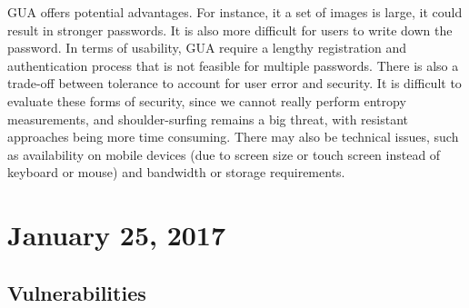 \documentclass[11pt]{article}
\theoremstyle{plain} %
\theoremstyle{definition}
\theoremstyle{example}
\theoremstyle{remark}
\begin{document}
GUA offers potential advantages. For instance, it a set of images is large, it could result in stronger passwords. It is also more difficult for users to write down the password. In terms of usability, GUA require a lengthy registration and authentication process that is not feasible for multiple passwords. There is also a trade-off between tolerance to account for user error and security. It is difficult to evaluate these forms of security, since we cannot really perform entropy measurements, and shoulder-surfing remains a big threat, with resistant approaches being more time consuming. There may also be technical issues, such as availability on mobile devices (due to screen size or touch screen instead of keyboard or mouse) and bandwidth or storage requirements. 


\section{January 25, 2017}
\subsection{Vulnerabilities}
\end{document}
